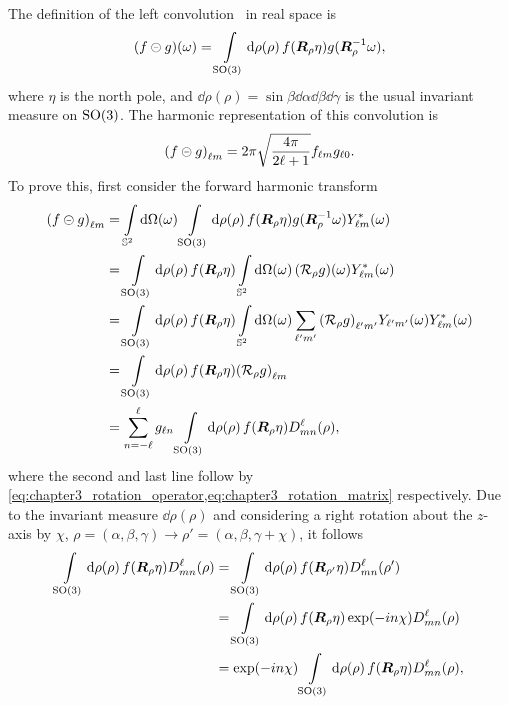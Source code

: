 The definition of the left convolution~\cite{Kennedy2011,Driscoll1994} in real space is
%
\begin{equation}
	\pixel{(f \circleddash g)}
	= \integrateRotation{\rho} f(\rotationMatrix\eta) g(\rotationMatrix^{-1}\omega),
\end{equation}
%
where \({\eta}\) is the north pole, and \(\dd{\rho(\rho)}=\sin{\beta} \dd{\alpha} \dd{\beta} \dd{\gamma}\) is the usual invariant measure on \(\rotationGroup{}\).
The harmonic representation of this convolution is
%
\begin{equation}
	\harmonic{(f \circleddash g)}
	= 2\pi \sqrt{\inverseFactor} \harmonic{f} \axiHarmonic{g}.
\end{equation}
%
To prove this, first consider the forward harmonic transform
%
\begin{align}
	\harmonic{(f \circleddash g)}
	 & = \integrateSphere{\omega} \integrateRotation{\rho} f(\rotationMatrix\eta) g(\rotationMatrix^{-1}\omega) \pixel{\conj{\harmonic{Y}}} \nonumber{}                                            \\
	 & = \integrateRotation{\rho} f(\rotationMatrix\eta) \integrateSphere{\omega} \pixel{(\rotation{\rho}g)} \pixel{\conj{\harmonic{Y}}} \nonumber{}                                               \\
	 & = \integrateRotation{\rho} f(\rotationMatrix\eta) \integrateSphere{\omega} \harmonicSum['] \harmonic[']{(\rotation{\rho}g)} \pixel{\harmonic[']{Y}} \pixel{\conj{\harmonic{Y}}} \nonumber{} \\
	 & = \integrateRotation{\rho} f(\rotationMatrix\eta) \harmonic{(\rotation{\rho}g)} \nonumber{}                                                                                                 \\
	 & = \sum\limits_{n=-\ell}^{\ell} g_{\ell n} \integrateRotation{\rho} f(\rotationMatrix\eta) \wigner{\ell}{m}{n}(\rho),
\end{align}
%
where the second and last line follow by \cref{eq:chapter3_rotation_operator,eq:chapter3_rotation_matrix} respectively.
Due to the invariant measure \(\dd{\rho(\rho)}\) and considering a right rotation about the \(z\)-axis by \({\chi}\), \ie{} \(\rho = (\alpha,\beta,\gamma) \rightarrow \rho' = (\alpha,\beta,\gamma+\chi)\), it follows
%
\begin{align}\label{eq:chapter3_so3_integral}
	\integrateRotation{\rho} f(\rotationMatrix\eta) \wigner{\ell}{m}{n}(\rho)
	 & = \integrateRotation{\rho} f(\rotationMatrix[']\eta) \wigner{\ell}{m}{n}(\rho') \nonumber{}             \\
	 & = \integrateRotation{\rho} f(\rotationMatrix\eta) \exp(-i n\chi) \wigner{\ell}{m}{n}(\rho) \nonumber{} \\
	 & = \exp(-i n\chi) \integrateRotation{\rho} f(\rotationMatrix\eta) \wigner{\ell}{m}{n}(\rho),
\end{align}
